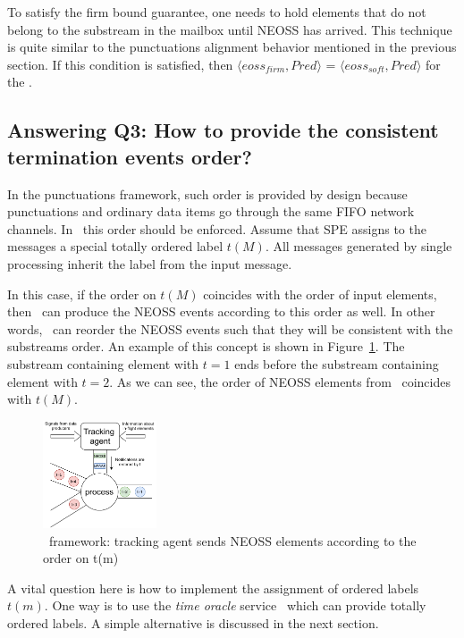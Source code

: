 To satisfy the firm bound guarantee, one needs to hold elements that do not belong to the substream in the mailbox until NEOSS has arrived. This technique is quite similar to the punctuations alignment behavior mentioned in the previous section. If this condition is satisfied, then $\langle eoss_{firm}, Pred\rangle$ = $\langle eoss_{soft}, Pred\rangle$ for the \tracker.

\subsection{Answering Q3: How to provide the consistent termination events order?}
\label{termination_order}
In the punctuations framework, such order is provided by design because punctuations and ordinary data items go through the same FIFO network channels. In \tracker\, this order should be enforced. Assume that SPE assigns to the messages a special totally ordered label $t(M)$. All messages generated by single processing inherit the label from the input message. 

In this case, if the order on $t(M)$ coincides with the order of input elements, then \tracker\ can produce the NEOSS events according to this order as well. In other words, \tracker\ can reorder the NEOSS events such that they will be consistent with the substreams order. An example of this concept is shown in Figure~\ref{tracker_ordering}. The substream containing element with $t=1$ ends before the substream containing element with $t=2$. As we can see, the order of NEOSS elements from \tracker\ coincides with $t(M)$.

\begin{figure}[t]
  \centering
  \includegraphics[width=0.30\textwidth]{pics/tracker-ordering.pdf}
  \caption{\tracker\ framework: tracking agent sends NEOSS elements according to the order on t(m)}
  \label{tracker_ordering}
\end{figure}

A vital question here is how to implement the assignment of ordered labels $t(m)$. One way is to use the {\em time oracle} service~\cite{10.14778/3055330.3055335} which can provide totally ordered labels. A simple alternative is discussed in the next section. 

